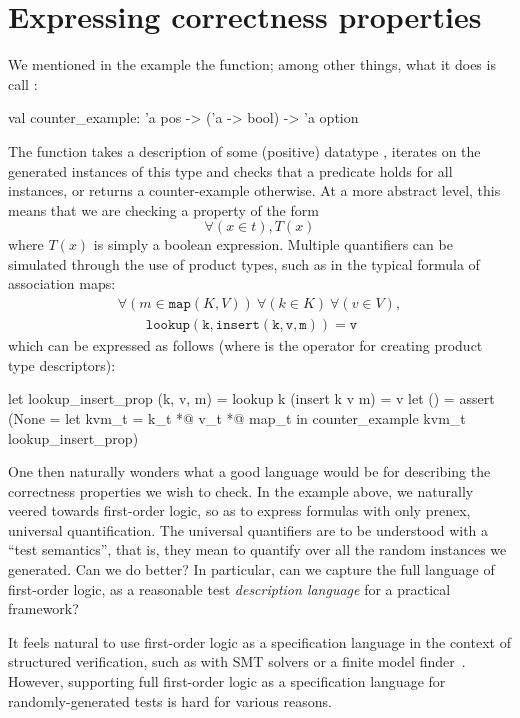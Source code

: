 \section{Expressing correctness properties}
\label{sec:properties}

We mentioned in the  example the  function; among other
things, what it does is call :
%
\begin{ocamlcode}
val counter_example: 'a pos -> ('a -> bool) -> 'a option
\end{ocamlcode}
%
The function takes a description of some (positive) datatype
, iterates on the generated instances of this type and checks
that a predicate  holds for all instances, or returns
a counter-example otherwise. At a more abstract level, this means that we are
checking a property of the form \[ \forall (x \in t), T(x) \] where
$T(x)$ is simply a boolean expression.
Multiple quantifiers can be simulated through the use of product types, such as
in the typical formula of association maps:
%
\[\begin{array}{l}
  \forall (m \in \mathtt{map}(K,V))\ \forall (k \in K)\ \forall (v \in V),\\
  \qquad \mathtt{lookup(k,insert(k,v,m)) = v}
\end{array}\]
%
which can be expressed as follows (where  is the operator for creating
product type descriptors):
%
\begin{ocamlcode}
  let lookup_insert_prop (k, v, m) =
    lookup k (insert k v m) = v
  let () = assert (None =
    let kvm_t = k_t *@ v_t *@ map_t in
    counter_example kvm_t lookup_insert_prop)
\end{ocamlcode}

One then naturally wonders what a good language would be for describing the
correctness properties we wish to check. In the example above, we naturally
veered towards first-order logic, so as to express formulas with only prenex,
universal quantification. The universal quantifiers are to be understood with a
``test semantics'', that is, they mean to quantify over all the random instances
we generated.
%
Can we do better? In particular, can we capture the full language of first-order
logic, as a reasonable test \emph{description language} for a practical
framework?

It feels natural to use first-order logic as a specification language
in the context of structured verification, such as with SMT solvers or
a finite model finder~\cite{DBLP:conf/itp/BlanchetteN10}.  However,
supporting full first-order logic as a specification language for
randomly-generated tests is hard for various reasons.


